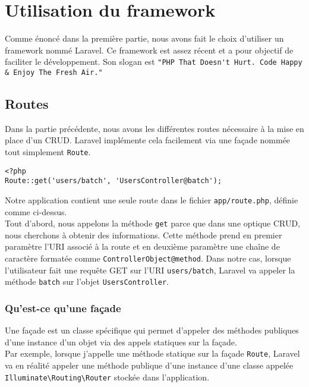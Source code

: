 \chapter{Utilisation du framework}

Comme énoncé dans la première partie, nous avons fait le choix d'utiliser un framework nommé Laravel. Ce framework est assez récent et a pour objectif de faciliter le développement. Son slogan est \verb|"PHP That Doesn't Hurt. Code Happy & Enjoy The Fresh Air."|

\section{Routes}

Dans la partie précédente, nous avons les différentes routes nécessaire à la mise en place d'un CRUD. Laravel implémente cela facilement via une façade nommée tout simplement \verb|Route|.

\begin{verbatim}
<?php
Route::get('users/batch', 'UsersController@batch');
\end{verbatim}
Notre application contient une seule route dans le fichier \verb|app/route.php|, définie comme ci-dessus.\\

Tout d'abord, nous appelons la méthode \verb|get| parce que dans une optique CRUD, nous cherchons à obtenir des informations. Cette méthode prend en premier paramètre l'URI associé à la route et en deuxième paramètre une chaîne de caractère  formatée comme \verb|ControllerObject@method|. Dans notre cas, lorsque l'utilisateur fait une requête GET sur l'URI \verb|users/batch|, Laravel va appeler la méthode \verb|batch| sur l'objet \verb|UsersController|.

\subsection*{Qu'est-ce qu'une façade}

Une façade est un classe spécifique qui permet d'appeler des méthodes publiques d'une instance d'un objet via des appels statiques sur la façade.\\

Par exemple, lorsque j'appelle une méthode statique sur la façade \verb|Route|, Laravel va en réalité appeler une méthode publique d'une instance d'une classe appelée \verb|Illuminate\Routing\Router| stockée dans l'application.\\

